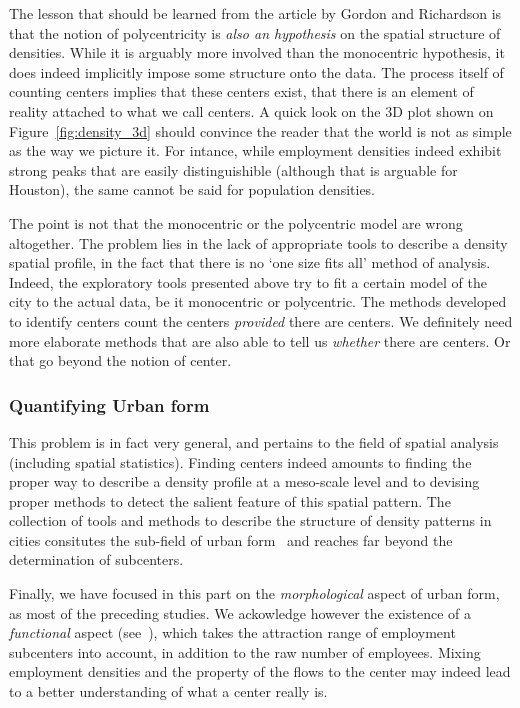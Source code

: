 The lesson that should be learned from the article by Gordon and Richardson is
that the notion of polycentricity is \emph{also an hypothesis} on the spatial
structure of densities. While it is arguably more involved than the monocentric
hypothesis, it does indeed implicitly impose some structure onto the data. The
process itself of counting centers implies that these centers exist, that there
is an element of reality attached to what we call centers. A quick look on the
3D plot shown on Figure~\ref{fig:density_3d} should convince the reader that the world
is not as simple as the way we picture it. For intance, while employment
densities indeed exhibit strong peaks that are easily distinguishible (although
that is arguable for Houston), the same cannot be said for population densities.

The point is not that the monocentric or the polycentric model are wrong
altogether. The problem lies in the lack of appropriate tools to describe a
density spatial profile, in the fact that there is no `one size fits all' method
of analysis. Indeed, the exploratory tools presented above try to fit a certain
model of the city to the actual data, be it monocentric or polycentric. The
methods developed to identify centers count the centers \emph{provided} there
are centers. We definitely need more elaborate methods that are also able to
tell us \emph{whether} there are centers. Or that go beyond the notion of
center.

\subsubsection{Quantifying Urban form}
\label{sub:urban_form}

This problem is in fact very general, and pertains to the field of spatial
analysis (including spatial statistics). Finding centers indeed amounts to
finding the proper way to describe a density profile at a meso-scale level and
to devising proper methods to detect the salient feature of this spatial
pattern. The collection of tools and methods to describe the structure
of density patterns in cities consitutes the sub-field of urban
form~\cite{Tsai:2005,Schwarz:2010,LeNechet:2015} and reaches far beyond the
determination of subcenters.

Finally, we have focused in this part on the \emph{morphological} aspect of urban form,
as most of the preceding studies. We ackowledge however the existence of a
\emph{functional} aspect (see~\cite{Berroir:2008}), which takes the attraction
range of employment subcenters into account, in addition to the raw number of
employees. Mixing employment densities and the property of the flows to the
center may indeed lead to a better understanding of what a center really is.


